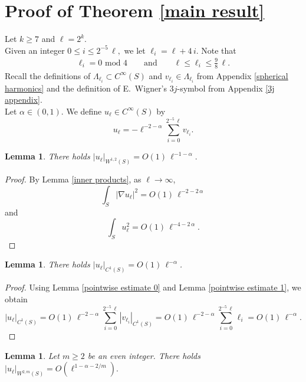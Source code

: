 \documentclass[11pt]{amsart}
\newtheorem{lemma}[theorem]{Lemma}
\theoremstyle {definition}
\begin{document}
\section{Proof of Theorem \ref{main result} }
Let $k\geq 7$ and $\ell=2^k$. \\ \indent Given an integer $0\leq i\leq 2^{-5}\, \ell,$ we let $\ell_i=\ell+4\,i$. Note that \begin{align*} \ell_i=0\,\,\text{mod}\,\, 4\qquad\text{and} \qquad \ell\leq \ell_i\leq\tfrac98\, \ell.\end{align*}  \indent 
Recall the definitions of $\Lambda_{\ell_i}\subset C^\infty(S)$ and $v_{\ell_i}\in \Lambda_{\ell_i}$ from Appendix \ref{spherical harmonics} and the  definition  of E.~Wigner's $3j$-symbol from Appendix \ref{3j appendix}.\\
 \indent 
Let $\alpha\in(0,1)$.  We define $u_\ell\in C^\infty(S)$ by 
$$
u_\ell=-\ell^{-2-\alpha}\sum_{i=0}^{2^{-5}\,\ell}v_{\ell_i}.
$$
\begin{lemma} There holds \label{estimates} $|u_\ell|_{W^{1,2}(S)}=O(1)\,\ell^{-1-\alpha}.$
\end{lemma} 
\begin{proof} 
By Lemma \ref{inner products}, as $\ell\to\infty$,
$$
\int_S |\nabla u_\ell|^2=O(1)\,\ell^{-2-2\,\alpha}
$$
and 
$$
\int_S u_\ell^2=O(1)\,\ell^{-4-2\,\alpha}.
$$
\end{proof} 
\begin{lemma} There holds $|u_\ell|_{C^{1}(S)}=O(1)\,\ell^{-\alpha}$. \label{c1 est}
\end{lemma}
\begin{proof}
	Using Lemma \ref{pointwise estimate 0} and Lemma \ref{pointwise estimate 1}, we obtain
	$$
	|u_\ell|_{C^{1}(S)}=O(1)\,\ell^{-2-\alpha}\sum_{i=0}^{2^{-5}\,\ell}|v_{\ell_i}|_{C^1(S)}=O(1)\,\ell^{-2-\alpha}\sum_{i=0}^{2^{-5}\,\ell}\ell_i=O(1)\,\ell^{-\alpha}.
	$$
\end{proof} 
\begin{lemma} \label{estimates w2p}
	Let $m\geq 2$ be an even integer.	There holds $|u_\ell|_{W^{2,m}(S)}=O(\ell^{1-\alpha-2/m}).$
\end{lemma}
\end{document}
